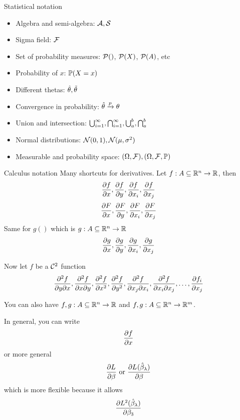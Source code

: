 \documentclass{beamer}
\providecommand{\tightlist}{\setlength{\itemsep}{0pt}\setlength{\parskip}{0pt}}
\begin{document}
\begin{frame}
\begin{block}{Statistical notation}
\protect\hypertarget{statistical-notation}{}
\begin{itemize}
\tightlist
\item
  Algebra and semi-algebra: \(\A,\S\)
\item
  Sigma field: \(\F\)
\item
  Set of probability measures: \(\prob\), \(\prob{X}\), \(\prob{A}\),
  etc
\item
  Probability of \(x\): \(\P(X = x)\)
\item
  Different thetas: \(\thetah, \thetat\)
\item
  Convergence in probability: \(\thetah \probconv \theta\)
\item
  Union and intersection:
  \(\infunion, \infintersection, \union{a}{b}, \intersection{a}{b}\)
\item
  Normal distributions: \(\normalstd, \normal{\mu}{\sigma^2}\)
\item
  Measurable and probability space: \(\mespace, \prspace\)
\end{itemize}
\end{block}
\end{frame}

\begin{frame}
\begin{block}{Calculus notation}
\protect\hypertarget{calculus-notation}{}
Many shortcuts for derivatives. Let \(\fn1\), then
\[\dfx, \dfy, \dfi, \dfj\] \[\dFx, \dFy, \dFi, \dFj\] Same for \(g()\)
which is \(\gn1\) \[\dgx, \dgy, \dgi, \dgj\]

Now let \(f\) be a \(\C^2\) function \[
\ddfyx, \ddfxy, \ddfx, \ddfy, \ddfij, \ddfji, \ldots, \dfij
\]
\end{block}
\end{frame}

\begin{frame}
You can also have \(\fgn1\) and \(\fgnm\).

In general, you can write \[
\prd{f}{x}
\] or more general
\[\diff{L}{}{\beta}{} \text{ or } \diffat{L}{}{\beta}{}{\hat\beta_{\lambda}}\]
which is more flexible because it allows
\[\diffat{L}{2}{\beta}{3}{\hat\beta_{\lambda}}\]
\end{frame}
\end{document}
